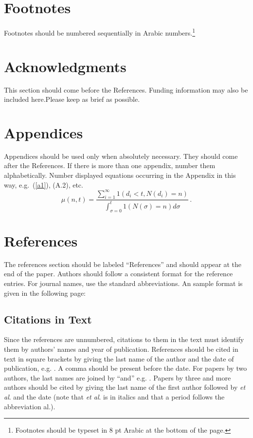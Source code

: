 \documentclass{IJCS_template}
\begin{document}
\section{Footnotes}
Footnotes should be numbered sequentially in Arabic
numbers.\footnote{Footnotes should be typeset in 8 pt Arabic at the
bottom of the page.}

\section*{Acknowledgments}
This section should come before the References. Funding information
may also be included here.Please keep as brief as possible.

\appendix

\section{Appendices}

Appendices should be used only when absolutely necessary. They should
come after the References. If there is more than one appendix, number
them alphabetically. Number displayed equations occurring in the
Appendix in this way, e.g.~(\ref{a1}), (A.2), etc.
\begin{equation}
\mu(n, t) = \frac{\sum^\infty_{i=1} 1(d_i < t,
N(d_i) = n)}{\int^t_{\sigma=0} 1(N(\sigma) = n)d\sigma}\,.
\label{a1}
\end{equation}

\section*{References}
The references section should be labeled ``References'' and should appear
at the end of the paper. Authors should follow a consistent format
for the reference entries. For journal names, use the standard abbreviations.
An sample format is given in the following page:

\subsection*{Citations in Text}
Since the references are unnumbered, citations to them in the text
must identify them by authors' names and year of
publication. References should be cited in text in square brackets by
giving the last name of the author and the date of publication,
e.g. \cite{wong89}. A comma should be present before the date.  For
papers by two authors, the last names are joined by ``and''
e.g. \cite{hussaini}. Papers by three and more authors should be cited
by  giving the last name of the first author followed by {\it et al}.
and the date (note that {\it et al}. is in italics and that a period
follows the abbreviation al.).
\end{document}
